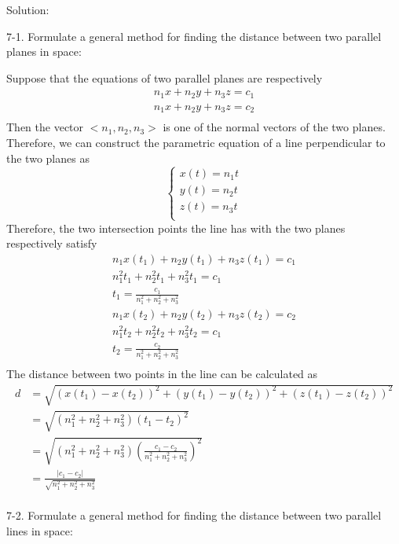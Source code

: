 \documentclass{article}
\begin{document}
Solution:

7-1. Formulate a general method for finding the distance between two parallel 
planes in space:

Suppose that the equations of two parallel planes are respectively
\begin{gather*}
  n_1x + n_2y + n_3z = c_1 \\
  n_1x + n_2y + n_3z = c_2 \\
\end{gather*}
Then the vector $<n_1, n_2, n_3>$ is one of the normal vectors of the two 
planes. Therefore, we can construct the parametric equation of a line 
perpendicular to the two planes as
\begin{equation*}
  \begin{cases}
    x(t) = n_1t \\
    y(t) = n_2t \\
    z(t) = n_3t \\
  \end{cases}
\end{equation*}
Therefore, the two intersection points the line has with the two planes 
respectively satisfy
\begin{gather*}
  n_1x(t_1) + n_2y(t_1) + n_3z(t_1) = c_1 \\
  n_1^2t_1 + n_2^2t_1 + n_3^2t_1 = c_1 \\
  t_1 = \frac{c_1}{n_1^2 + n_2^2 + n_3^2} \\
  n_1x(t_2) + n_2y(t_2) + n_3z(t_2) = c_2 \\
  n_1^2t_2 + n_2^2t_2 + n_3^2t_2 = c_1 \\
  t_2 = \frac{c_2}{n_1^2 + n_2^2 + n_3^2} \\
\end{gather*}
The distance between two points in the line can be calculated as 
\begin{equation*}
  \begin{split}
    d &= \sqrt{(x(t_1) - x(t_2))^2 + (y(t_1) - y(t_2))^2 + (z(t_1) - z(t_2))^2} \\
      &= \sqrt{(n_1^2 + n_2^2 + n_3^2)(t_1 - t_2)^2} \\
      &= \sqrt{(n_1^2 + n_2^2 + n_3^2)(\frac{c_1 - c_2}{n_1^2 + n_2^2 + n_3^2})^2} \\
      &= \frac{|c_1 - c_2|}{\sqrt{n_1^2 + n_2^2 + n_3^2}} \\
  \end{split}
\end{equation*}

7-2. Formulate a general method for finding the distance between two parallel 
lines in space:
\end{document}
